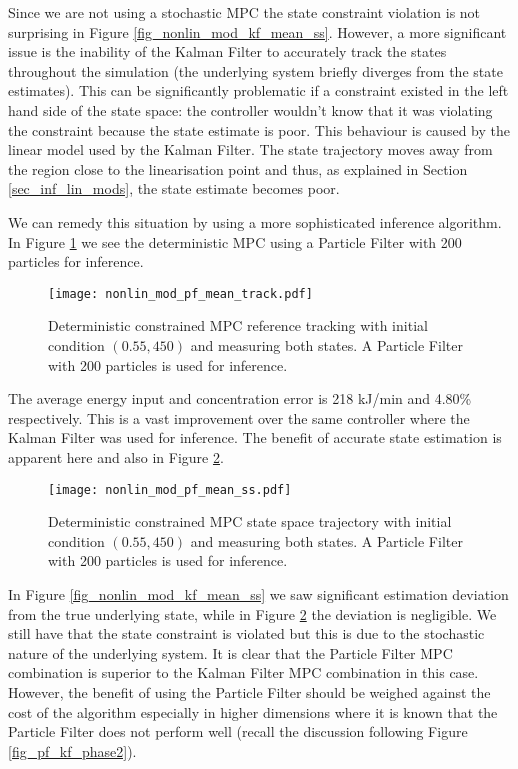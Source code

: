 Since we are not using a stochastic MPC the state constraint violation is not surprising in Figure \ref{fig_nonlin_mod_kf_mean_ss}. However, a more significant issue is the inability of the Kalman Filter to accurately track the states throughout the simulation (the underlying system briefly diverges from the state estimates). This can be significantly problematic if a constraint existed in the left hand side of the state space: the controller wouldn't know that it was violating the constraint because the state estimate is poor. This behaviour is caused by the linear model used by the Kalman Filter. The state trajectory moves away from the region close to the linearisation point and thus, as explained in Section \ref{sec_inf_lin_mods}, the state estimate becomes poor.

We can remedy this situation by using a more sophisticated inference algorithm. In Figure \ref{fig_nonlin_mod_pf_mean_track} we see the deterministic MPC using a Particle Filter with 200 particles for inference. 
\begin{figure}[H] 
\centering
\texttt{[image: nonlin\_mod\_pf\_mean\_track.pdf]}
\caption{Deterministic constrained MPC reference tracking with initial condition $(0.55, 450)$ and measuring both states. A Particle Filter with 200 particles is used for inference.}
\label{fig_nonlin_mod_pf_mean_track}
\end{figure} 
The average energy input and concentration error is 218 kJ/min and 4.80\% respectively. This is a vast improvement over the same controller where the Kalman Filter was used for inference. The benefit of accurate state estimation is apparent here and also in Figure \ref{fig_nonlin_mod_pf_mean_ss}.
\begin{figure}[H] 
\centering
\texttt{[image: nonlin\_mod\_pf\_mean\_ss.pdf]}
\caption{Deterministic constrained MPC state space trajectory with initial condition $(0.55, 450)$ and measuring both states. A Particle Filter with 200 particles is used for inference.}
\label{fig_nonlin_mod_pf_mean_ss}
\end{figure}
In Figure \ref{fig_nonlin_mod_kf_mean_ss} we saw significant estimation deviation from the true underlying state, while in Figure \ref{fig_nonlin_mod_pf_mean_ss} the deviation is negligible. We still have that the state constraint is violated but this is due to the stochastic nature of the underlying system. It is clear that the Particle Filter MPC combination is superior to the Kalman Filter MPC combination in this case. However, the benefit of using the Particle Filter should be weighed against the cost of the algorithm especially in higher dimensions where it is known that the Particle Filter does not perform well (recall the discussion following Figure \ref{fig_pf_kf_phase2}).

